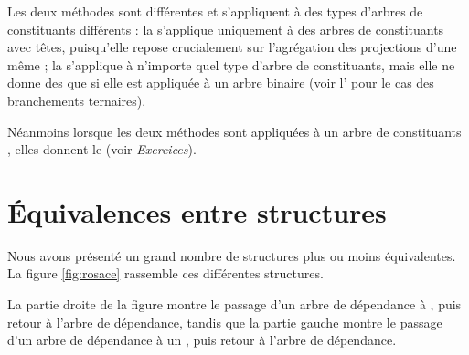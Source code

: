 Les deux méthodes sont différentes et s’appliquent à des types d’arbres de constituants différents : la  s’applique uniquement à des arbres de constituants avec têtes, puisqu’elle repose crucialement sur l’agrégation des projections d’une même ; la  s’applique à n’importe quel type d’arbre de constituants, mais elle ne donne des  que si elle est appliquée à un arbre binaire (voir l’ pour le cas des branchements ternaires).

Néanmoins lorsque les deux méthodes sont appliquées à un arbre de constituants , elles donnent le  (voir \textit{Exercices}).

\section{Équivalences entre structures}\label{sec:3.4.25}

Nous avons présenté un grand nombre de structures plus ou moins équivalentes. La figure \ref{fig:rosace} rassemble ces différentes structures.

La partie droite de la figure montre le passage d’un arbre de dépendance à , puis retour à l’arbre de dépendance, tandis que la partie gauche montre le passage d’un arbre de dépendance à un , puis retour à l’arbre de dépendance.

